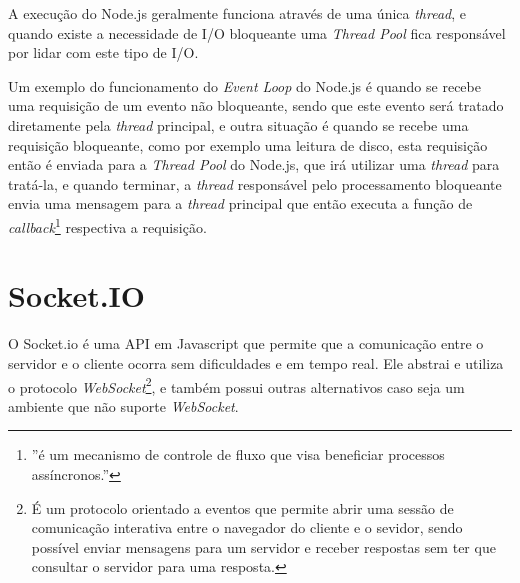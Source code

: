 \begin{description}
A execução do Node.js geralmente funciona através de uma única \textit{thread}, e quando existe a necessidade de I/O bloqueante uma \textit{Thread Pool} fica responsável por lidar com este tipo de I/O.  

Um exemplo do funcionamento do \textit{Event Loop} do Node.js é quando se recebe uma requisição de um evento não bloqueante, sendo que este evento será tratado diretamente pela \textit{thread} principal, e outra situação é quando se recebe uma requisição bloqueante, como por exemplo uma leitura de disco, esta requisição então é enviada para a \textit{Thread Pool} do Node.js, que irá utilizar uma \textit{thread} para tratá-la, e quando terminar, a \textit{thread} responsável pelo processamento bloqueante envia uma mensagem para a \textit{thread} principal que então executa a função de \textit{callback}\footnote{''é um mecanismo de controle de fluxo que visa beneficiar processos assíncronos.''\cite{StackOCallbk}} respectiva a requisição.
    
\end{description}

\section{Socket.IO}
\label{subsec: Socket.io}
O Socket.io é uma API em Javascript que permite que a comunicação entre o servidor e o cliente ocorra sem dificuldades e em tempo real. Ele abstrai e utiliza o protocolo \textit{WebSocket}\footnote{É um protocolo orientado a eventos que permite abrir uma sessão de comunicação interativa entre o navegador do cliente e o sevidor, sendo possível enviar mensagens para um servidor e receber respostas sem ter que consultar o servidor para uma resposta.},  e também possui outras alternativos caso seja um ambiente que não suporte \textit{WebSocket}.